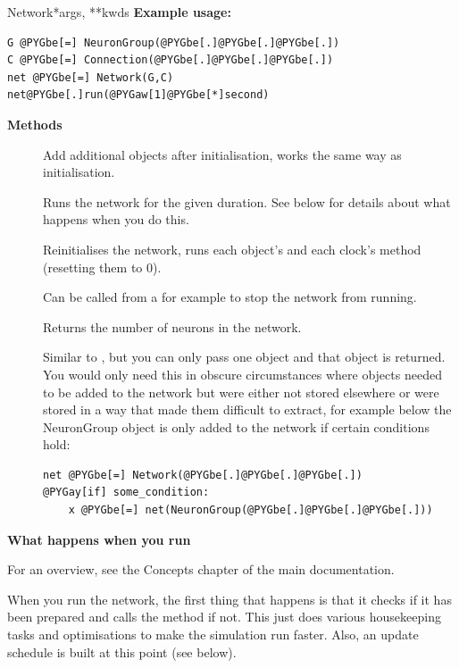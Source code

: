 \documentclass[letterpaper,10pt]{manual}
\begin{document}
\begin{classdesc}{Network}{*args, **kwds}
\textbf{Example usage:}

\begin{Verbatim}[commandchars=@\[\]]
G @PYGbe[=] NeuronGroup(@PYGbe[.]@PYGbe[.]@PYGbe[.])
C @PYGbe[=] Connection(@PYGbe[.]@PYGbe[.]@PYGbe[.])
net @PYGbe[=] Network(G,C)
net@PYGbe[.]run(@PYGaw[1]@PYGbe[*]second)
\end{Verbatim}

\textbf{Methods}
\begin{description}
\item[]
Add additional objects after initialisation, works the same way
as initialisation.

\item[]
Runs the network for the given duration. See below for details about
what happens when you do this.

\item[]
Reinitialises the network, runs each object's  and each
clock's  method (resetting them to 0).

\item[]
Can be called from a \hyperlink{brian.network_operation}{} for example to stop the
network from running.

\item[]
Returns the number of neurons in the network.

\item[]
Similar to , but you can only pass one object and that
object is returned. You would only need this in obscure
circumstances where objects needed to be added to the network
but were either not stored elsewhere or were stored in a way
that made them difficult to extract, for example below the
NeuronGroup object is only added to the network if certain
conditions hold:

\begin{Verbatim}[commandchars=@\[\]]
net @PYGbe[=] Network(@PYGbe[.]@PYGbe[.]@PYGbe[.])
@PYGay[if] some_condition:
    x @PYGbe[=] net(NeuronGroup(@PYGbe[.]@PYGbe[.]@PYGbe[.]))
\end{Verbatim}

\end{description}

\textbf{What happens when you run}

For an overview, see the Concepts chapter of the main documentation.

When you run the network, the first thing that happens is that it
checks if it has been prepared and calls the  method
if not. This just does various housekeeping tasks and optimisations
to make the simulation run faster. Also, an update schedule is
built at this point (see below).


\end{classdesc}
\end{document}
